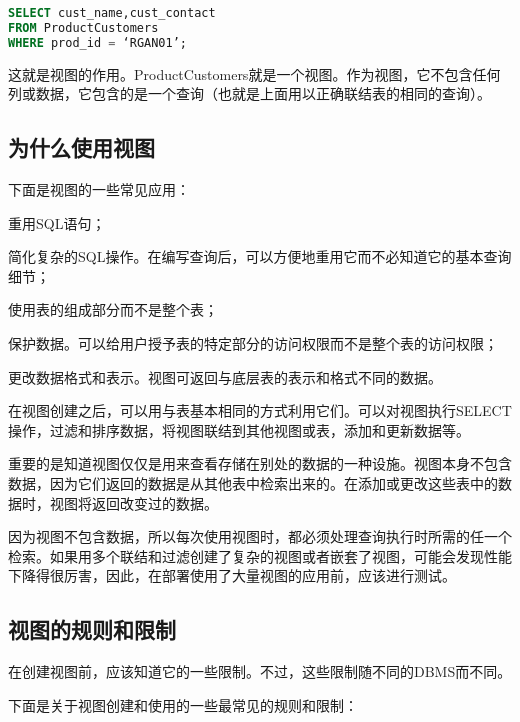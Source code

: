 \begin{lstlisting}[language=SQL]
SELECT cust_name,cust_contact
FROM ProductCustomers
WHERE prod_id = ‘RGAN01’;
\end{lstlisting}

这就是视图的作用。ProductCustomers就是一个视图。作为视图，它不包含任何列或数据，它包含的是一个查询（也就是上面用以正确联结表的相同的查询）。

\subsection{为什么使用视图}


下面是视图的一些常见应用：

\begin{compactitem}
\item 重用SQL语句；
\item 简化复杂的SQL操作。在编写查询后，可以方便地重用它而不必知道它的基本查询细节；
\item 使用表的组成部分而不是整个表；
\item 保护数据。可以给用户授予表的特定部分的访问权限而不是整个表的访问权限；
\item 更改数据格式和表示。视图可返回与底层表的表示和格式不同的数据。
\end{compactitem}

在视图创建之后，可以用与表基本相同的方式利用它们。可以对视图执行SELECT操作，过滤和排序数据，将视图联结到其他视图或表，添加和更新数据等。

重要的是知道视图仅仅是用来查看存储在别处的数据的一种设施。视图本身不包含数据，因为它们返回的数据是从其他表中检索出来的。在添加或更改这些表中的数据时，视图将返回改变过的数据。

因为视图不包含数据，所以每次使用视图时，都必须处理查询执行时所需的任一个检索。如果用多个联结和过滤创建了复杂的视图或者嵌套了视图，可能会发现性能下降得很厉害，因此，在部署使用了大量视图的应用前，应该进行测试。


\subsection{视图的规则和限制}

在创建视图前，应该知道它的一些限制。不过，这些限制随不同的DBMS而不同。

下面是关于视图创建和使用的一些最常见的规则和限制：

